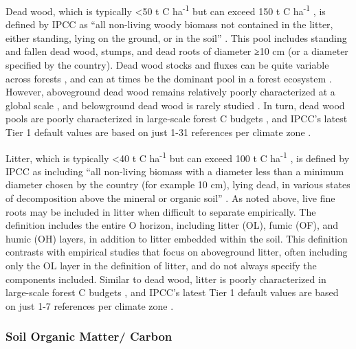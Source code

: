 \documentclass[, manuscript]{copernicus}
\begin{document}
Dead wood, which is typically \textless50 t C ha\textsuperscript{-1} but
can exceed 150 t C ha\textsuperscript{-1}
\citep{anderson-teixeira_carbon_2021}, is defined by IPCC as ``all
non-living woody biomass not contained in the litter, either standing,
lying on the ground, or in the soil''
\citep{ipcc_good_2003, ipcc_2006_2006}. This pool includes standing and
fallen dead wood, stumps, and dead roots of diameter ≥10 cm (or a
diameter specified by the country). Dead wood stocks and fluxes can be
quite variable across forests \citep{anderson-teixeira_carbon_2021}, and
can at times be the dominant pool in a forest ecosystem \citep[e.g.,
following a severe natural disturbance,][]{carmona_coarse_2002}.
However, aboveground dead wood remains relatively poorly characterized
at a global scale \citep{anderson-teixeira_carbon_2021}, and belowground
dead wood is rarely studied \citep{merganicova_dadwood_2012}. In turn,
dead wood pools are poorly characterized in large-scale forest C budgets
\citep{pan_large_2011, harris_global_2021}, and IPCC's latest Tier 1
default values are based on just 1-31 references per climate zone
\citep[Table 2.2 in][]{ipcc_2019_2019}.

Litter, which is typically \textless40 t C ha\textsuperscript{-1} but
can exceed 100 t C ha\textsuperscript{-1}
\citep{anderson-teixeira_carbon_2021}, is defined by IPCC as including
``all non-living biomass with a diameter less than a minimum diameter
chosen by the country (for example 10 cm), lying dead, in various states
of decomposition above the mineral or organic soil''
\citep{ipcc_good_2003, ipcc_2006_2006}. As noted above, live fine roots
may be included in litter when difficult to separate empirically. The
definition includes the entire O horizon, including litter (OL), fumic
(OF), and humic (OH) layers, in addition to litter embedded within the
soil. This definition contrasts with empirical studies that focus on
aboveground litter, often including only the OL layer in the definition
of litter, and do not always specify the components included. Similar to
dead wood, litter is poorly characterized in large-scale forest C
budgets \citep{pan_large_2011, harris_global_2021}, and IPCC's latest
Tier 1 default values are based on just 1-7 references per climate zone
\citep[Table 2.2 in][]{ipcc_2019_2019}.

\subsubsection{Soil Organic Matter/ Carbon}
\end{document}
